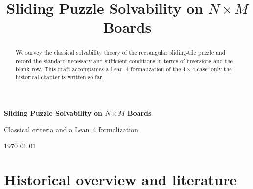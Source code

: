 \documentclass[11pt]{article}
\title{Sliding Puzzle Solvability on \texorpdfstring{$N\times M$}{N×M} Boards}
\author{}
\date{}
\begin{document}
\begin{center}
  {\LARGE\bfseries Sliding Puzzle Solvability on $N\times M$ Boards\par}
  \vspace{0.6em}
  {\large Classical criteria and a Lean~4 formalization\par}
  \vspace{0.4em}
  {\normalsize\today\par}
\end{center}
\vspace{1.5em}

\begin{abstract}
\noindent
We survey the classical solvability theory of the rectangular sliding-tile puzzle
and record the standard necessary and sufficient conditions in terms of inversions
and the blank row.
This draft accompanies a Lean~4 formalization of the $4\times 4$ case;
only the historical chapter is written so far.
\end{abstract}

\tableofcontents
\newpage

\section{Historical overview and literature}\label{ch:history}





\end{document}
